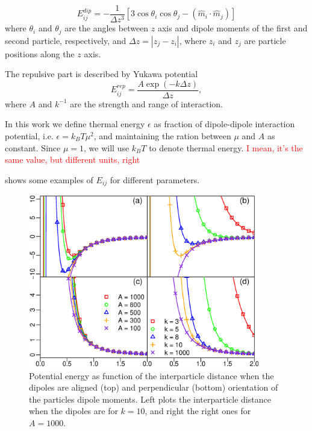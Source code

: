 \begin{equation}
\label{eq:dipole_dipole_1D}
E_{ij}^{dip} = - \frac{1}{\Delta z^3} [3 \cos \theta_i \cos \theta_j - (\hat{m}_i \cdot \hat{m}_j)]
\end{equation}
where $\theta_i$ and $\theta_j$ are the angles between $z$ axis and dipole moments of the first and second particle, respectively, and $\Delta z = |z_j - z_i|$, where $z_i$ and $z_j$ are particle positions along the $z$ axis.

The repulsive part is described by Yukawa potential
\begin{equation}
\label{eq:yukawa_interaction}
E_{ij}^{rep} = \frac{A \exp(-k \Delta z)}{\Delta z},
\end{equation}
where $A$ and $k^{-1}$ are the strength and range of interaction. 

In this work we define thermal energy $\epsilon$ as fraction of dipole-dipole interaction potential, i.e. $\epsilon = k_BT \mu^2$, and maintaining the ration between $\mu$ and $A$ as constant. Since $\mu = 1$, we will use $k_BT$ to denote thermal energy. \textcolor{red}{I mean, it's the same value, but different units, right}

 shows some examples of $E_{ij}$ for different parameters.

\begin{figure}[p]
\centering
	\includegraphics[width=0.9\textwidth]{Images/particle_interaction_potential}
\captionsetup{justification=centering, width=0.9\textwidth}
\caption{Potential energy as function of the interparticle distance when the dipoles are aligned (top) and perpendicular (bottom) orientation of the particles dipole moments. Left plots the interparticle distance when the dipoles are for $k = 10$, and right the right ones for $A = 1000$.}
\label{fig:interaction_energy}
\end{figure}


